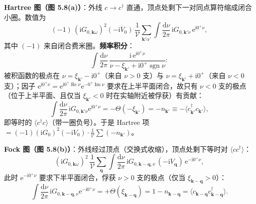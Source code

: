 \textbf{Hartree 图（图 5.8(a)）}：外线 $c\to c^{\dagger}$ 直通，顶点处剩下一对同点算符缩成闭合小圈。数值为
\begin{equation*}
(-1)\,(\mathrm{i}G_{0,\pmb{k}\omega})^{2}(-\mathrm{i}V_0)\,
\frac{1}{\mathcal V}\sum_{\pmb{k}'\alpha'}\int\frac{\mathrm{d}\nu}{2\pi}\,\mathrm{i}G_{0,\pmb{k}'\nu}\,\mathrm{e}^{\mathrm{i}0^{+}\nu},
\end{equation*}
其中 $(-1)$ 来自闭合费米圈。\textbf{频率积分}：
\begin{equation*}
\int\frac{\mathrm{d}\nu}{2\pi}\,\frac{\mathrm{i}\,\mathrm{e}^{\mathrm{i}0^{+}\nu}}{\nu-\xi_{\pmb{k}'}+\mathrm{i}0^{+}\operatorname{sgn}\nu}:
\end{equation*}
被积函数的极点在 $\nu=\xi_{\pmb{k}'}-\mathrm{i}0^{+}$（来自 $\nu>0$ 支）与 $\nu=\xi_{\pmb{k}'}+\mathrm{i}0^{+}$（来自 $\nu<0$ 支）；因子 $\mathrm{e}^{\mathrm{i}0^{+}\nu}=\mathrm{e}^{\mathrm{i}0^{+}\operatorname{Re}\nu}\mathrm{e}^{-0^{+}\operatorname{Im}\nu}$ 要求在上半平面闭合，故只有 $\nu<0$ 支的极点（位于上半平面、且仅当 $\xi_{\pmb{k}'}<0$ 时在实轴附近被俘获）有贡献：
\begin{equation*}
\int\frac{\mathrm{d}\nu}{2\pi}\,\mathrm{i}G_{0,\pmb{k}'\nu}\mathrm{e}^{\mathrm{i}0^{+}\nu}
=-\Theta(-\xi_{\pmb{k}'})=-n_{\pmb{k}'}\equiv-\langle c^{\dagger}_{\pmb{k}'}c_{\pmb{k}'}\rangle ,
\end{equation*}
即等时的 $\langle c^{\dagger}c\rangle$（带一圈负号）。于是 Hartree 项 $=(-1)(\mathrm{i}G_0)^{2}(-\mathrm{i}V_0)\cdot\frac{1}{\mathcal V}\sum(-n_{\pmb{k}'})$。

\textbf{Fock 图（图 5.8(b)）}：外线经过顶点（交换式收缩），顶点处剩下等时对 $\langle cc^{\dagger}\rangle$：
\begin{equation*}
(\mathrm{i}G_{0,\pmb{k}\omega})^{2}\,\frac{1}{\mathcal V}\sum_{\pmb{q}}\int\frac{\mathrm{d}\nu}{2\pi}\,
\mathrm{i}G_{0,\pmb{k}-\pmb{q},\nu}\,(-\mathrm{i}V_{\pmb{q}})\,\mathrm{e}^{-\mathrm{i}0^{+}\nu},
\end{equation*}
此时 $\mathrm{e}^{-\mathrm{i}0^{+}\nu}$ 要求下半平面闭合，俘获 $\nu>0$ 支的极点（仅当 $\xi_{\pmb{k}-\pmb{q}}>0$）：
\begin{equation*}
\int\frac{\mathrm{d}\nu}{2\pi}\,\mathrm{i}G_{0,\pmb{k}-\pmb{q},\nu}\mathrm{e}^{-\mathrm{i}0^{+}\nu}
=+\Theta(\xi_{\pmb{k}-\pmb{q}})=1-n_{\pmb{k}-\pmb{q}}=\langle c_{\pmb{k}-\pmb{q}}c^{\dagger}_{\pmb{k}-\pmb{q}}\rangle .
\end{equation*}

